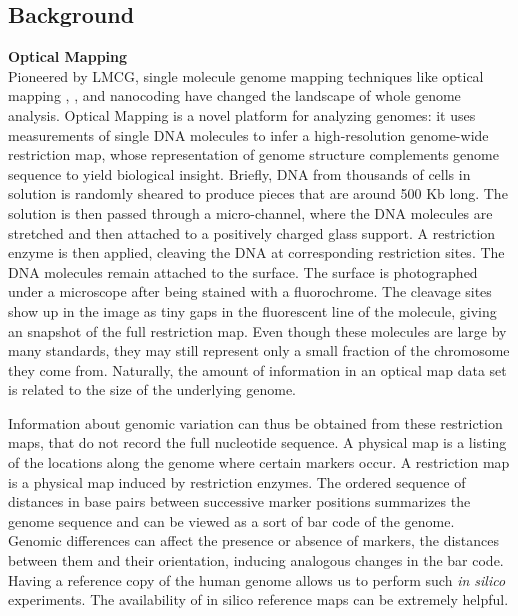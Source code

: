 \documentclass[11pt]{extarticle} %
\begin{document}
\subsection{Background} 
\noindent
{\bf{Optical Mapping}} \\
Pioneered by LMCG, single molecule genome mapping techniques like optical mapping \cite{Schwartz_etal_1993_Science}, \cite{Dimalanta_etal_2004_AnalChem}, and nanocoding \cite{Jo_etal_2007_PNAS} have changed the landscape of whole genome analysis. Optical Mapping is a novel platform for analyzing genomes: it uses measurements of single DNA molecules to infer a high-resolution genome-wide restriction map, whose representation of genome structure complements genome sequence to yield biological insight. Briefly, DNA from thousands of cells in solution is randomly sheared to produce pieces that are around 500 Kb long. The solution is then passed through a micro-channel, where the DNA molecules are stretched and then attached to a positively charged glass support. A restriction enzyme is then applied, cleaving the DNA at corresponding restriction sites. The DNA molecules remain attached to the surface. The surface is photographed under a microscope after being stained with a fluorochrome. The cleavage sites show up in the image as tiny gaps in the fluorescent line of the molecule, giving an snapshot of the full restriction map. Even though these molecules are large by many standards, they may still represent only a small fraction of the chromosome they come from. Naturally, the amount of information in an optical map data set is related to the size of the underlying genome. 

Information about genomic variation can thus be obtained from these restriction maps, that do not record the full nucleotide sequence. A physical map is a listing of the locations along the genome where certain markers occur. A restriction map is a physical map induced by restriction enzymes. The ordered sequence of distances in base pairs between successive marker positions summarizes the genome sequence and can be viewed as a sort of bar code of the genome. Genomic differences can affect the presence or absence of markers, the distances between them and their orientation, inducing analogous changes in the bar code. Having a reference copy of the human genome allows us to perform such {\emph{in silico}} experiments. The availability of in silico reference maps can be extremely helpful. \\
\end{document}
